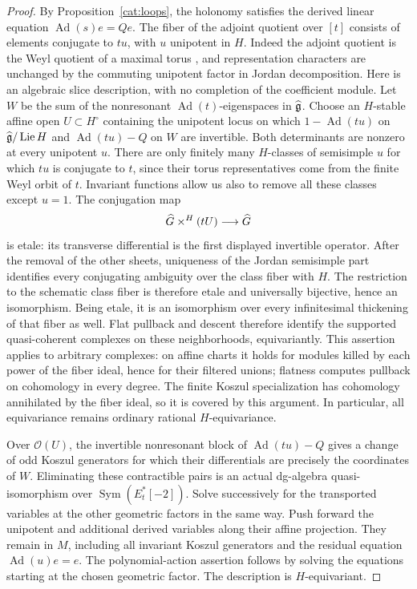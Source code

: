 \begin{proof}
By Proposition~\ref{cat:loops}, the holonomy satisfies the derived
linear equation $\operatorname{Ad}(s)e=Qe$.
The fiber of the adjoint quotient over $[t]$ consists of elements
conjugate to $tu$, with $u$ unipotent in $H$.
Indeed the adjoint quotient is the Weyl quotient of a maximal torus
\cite[Theorem~4.1\textup{(2)}]{LeeAdjointQuotients}, and representation
characters are unchanged by the commuting unipotent factor in Jordan
decomposition.
Here is an algebraic slice description, with no completion of the
coefficient module.  Let $W$ be the sum of the nonresonant
$\operatorname{Ad}(t)$-eigenspaces in $\widehat{\mathfrak g}$.  Choose an
$H$-stable affine open $U\subset H^\circ$ containing the unipotent
locus on which $1-\operatorname{Ad}(tu)$ on
$\widehat{\mathfrak g}/\operatorname{Lie}H$ and $\operatorname{Ad}(tu)-Q$ on
$W$ are invertible.  Both determinants are nonzero at every
unipotent $u$.  There are only finitely many $H$-classes of
semisimple $u$ for which $tu$ is conjugate to $t$, since their
torus representatives come from the finite Weyl orbit of $t$.
Invariant functions allow us also to remove all these classes
except $u=1$.
The conjugation map
\[
 \widehat G\mathbin{\times}^{H}(tU)\longrightarrow\widehat G
\]
is etale: its transverse differential is the first displayed
invertible operator.  After the removal of the other sheets,
uniqueness of the Jordan semisimple part identifies every
conjugating ambiguity over the class fiber with $H$.
The restriction to the schematic class fiber is therefore etale
and universally bijective, hence an isomorphism.
Being etale, it is an isomorphism over every infinitesimal
thickening of that fiber as well.  Flat pullback and descent
therefore identify the supported quasi-coherent complexes on
these neighborhoods, equivariantly.  This assertion applies to
arbitrary complexes: on affine charts it holds for modules killed
by each power of the fiber ideal, hence for their filtered unions;
flatness computes pullback on cohomology in every degree.
The finite Koszul specialization has cohomology annihilated by
the fiber ideal, so it is covered by this argument.  In particular,
all equivariance remains ordinary rational $H$-equivariance.

Over $\mathcal O(U)$, the invertible nonresonant block of
$\operatorname{Ad}(tu)-Q$ gives a change of odd Koszul generators
for which their differentials are precisely the coordinates of
$W$.  Eliminating these contractible pairs is an actual dg-algebra
quasi-isomorphism over $\operatorname{Sym}(E_t^*[-2])$.
Solve successively for the transported variables at the other
geometric factors in the same way.  Push forward the unipotent
and additional derived variables along their affine projection.
They remain in $M$, including all invariant Koszul generators and
the residual equation $\operatorname{Ad}(u)e=e$.
The polynomial-action assertion follows by solving the equations
starting at the chosen geometric factor.  The description is
$H$-equivariant.


\end{proof}
